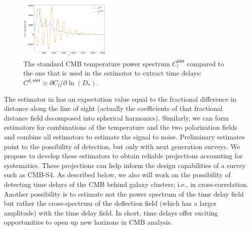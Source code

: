 \begin{figure}
\centering
\includegraphics[width=0.4\textwidth]{TT1}
\caption{\footnotesize \label{fig:TT1} The standard CMB temperature
  power spectrum $C_l^{\Theta\Theta}$ compared to the one that is used
  in the estimator to extract time delays: $C^{d,\Theta\Theta}\equiv
  \partial C_l/\partial \ln(D_*)$.}
\end{figure} 

 The estimator in  has an expectation value equal to the fractional difference in distance along the line of sight (actually the coefficients of that fractional distance field decomposed into spherical harmonics). Similarly, we can form estimators for combinations of the temperature and the two polarization fields and combine all estimators to estimate the signal to noise. Preliminary estimates point to the possibility of detection, but only with next generation surveys. We propose to develop these estimators to obtain reliable projections accounting for systematics. These projections can help inform the design capabilities of a survey such as CMB-S4. As described below, we also will work on the possibility of detecting time delays of the CMB behind galaxy clusters; i.e., in cross-correlation. Another possibility is to estimate not the power spectrum of the time delay field but rather the cross-spectrum of the deflection field (which has a larger amplitude) with the time delay field. In short, time delays offer exciting opportunities to open up new horizons in CMB analysis.
